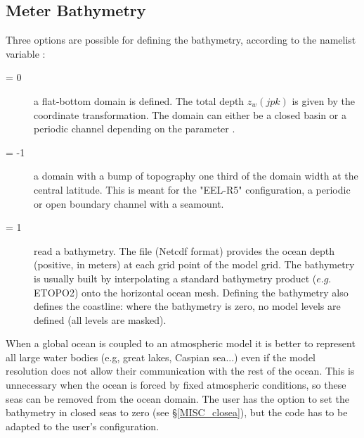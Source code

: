 {%
\subsection{Meter Bathymetry}
\label{DOM_bathy}

Three options are possible for defining the bathymetry, according to the 
namelist variable : 
\begin{description}
\item[ = 0] a flat-bottom domain is defined. The total depth $z_w (jpk)$ 
is given by the coordinate transformation. The domain can either be a closed 
basin or a periodic channel depending on the parameter . 
\item[ = -1] a domain with a bump of topography one third of the 
domain width at the central latitude. This is meant for the "EEL-R5" configuration, 
a periodic or open boundary channel with a seamount. 
\item[ = 1] read a bathymetry. The  file (Netcdf format) 
provides the ocean depth (positive, in meters) at each grid point of the model grid. 
The bathymetry is usually built by interpolating a standard bathymetry product 
($e.g.$ ETOPO2) onto the horizontal ocean mesh. Defining the bathymetry also 
defines the coastline: where the bathymetry is zero, no model levels are defined 
(all levels are masked).
\end{description}

When a global ocean is coupled to an atmospheric model it is better to represent 
all large water bodies (e.g, great lakes, Caspian sea...) even if the model 
resolution does not allow their communication with the rest of the ocean. 
This is unnecessary when the ocean is forced by fixed atmospheric conditions, 
so these seas can be removed from the ocean domain. The user has the option 
to set the bathymetry in closed seas to zero (see \S\ref{MISC_closea}), but the 
code has to be adapted to the user's configuration. 

}
